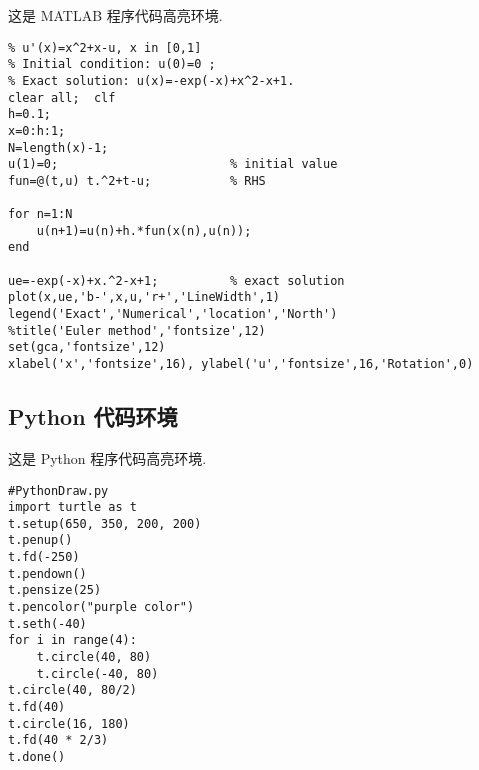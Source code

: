 这是 MATLAB 程序代码高亮环境.


\begin{lstlisting}[style=matlab,basicstyle=\footnotesize\fontspec{Courier New},title={MATLAB code}]
% Euler method for the ODE model
% u'(x)=x^2+x-u, x in [0,1]
% Initial condition: u(0)=0 ;
% Exact solution: u(x)=-exp(-x)+x^2-x+1.
clear all;  clf
h=0.1;
x=0:h:1;
N=length(x)-1;
u(1)=0;                        % initial value
fun=@(t,u) t.^2+t-u;           % RHS

for n=1:N
    u(n+1)=u(n)+h.*fun(x(n),u(n));
end

ue=-exp(-x)+x.^2-x+1;          % exact solution
plot(x,ue,'b-',x,u,'r+','LineWidth',1)
legend('Exact','Numerical','location','North')
%title('Euler method','fontsize',12)
set(gca,'fontsize',12)
xlabel('x','fontsize',16), ylabel('u','fontsize',16,'Rotation',0)
\end{lstlisting}

\subsection{Python 代码环境}

这是 Python 程序代码高亮环境.

\begin{lstlisting}[style=python,basicstyle=\footnotesize\fontspec{Consolas},title={Python code}]
#PythonDraw.py
import turtle as t
t.setup(650, 350, 200, 200)
t.penup()
t.fd(-250)
t.pendown()
t.pensize(25)
t.pencolor("purple color")
t.seth(-40)
for i in range(4):
    t.circle(40, 80)
    t.circle(-40, 80)
t.circle(40, 80/2)
t.fd(40)
t.circle(16, 180)
t.fd(40 * 2/3)
t.done()
\end{lstlisting}


